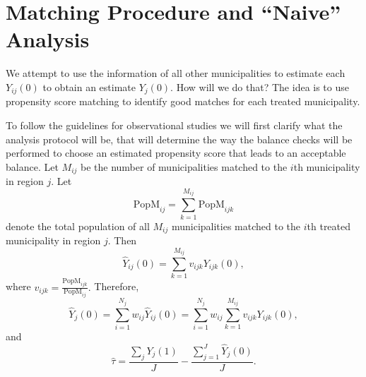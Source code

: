 \documentclass{article}[11 pt]
\begin{document}
\section{Matching Procedure and ``Naive'' Analysis}

We attempt to use the information of all other municipalities to estimate each $Y_{ij}(0)$ to obtain an estimate $Y_j(0)$. How will we do that? The idea is to use propensity score matching to identify good matches for each treated municipality.

To follow the guidelines for observational studies we will first clarify what the analysis protocol will be, that will determine the way the balance checks will be performed to choose an estimated propensity score that leads to an acceptable balance.
Let $M_{ij}$ be the number of municipalities matched to the $i$th municipality in region $j$. Let $$\textrm{PopM}_{ij}=\sum_{k=1}^{M_{ij}}\textrm{PopM}_{ijk}$$ denote the total population of all $M_{ij}$ municipalities matched to the $i$th treated municipality in region $j$. Then 
$$\hat{Y}_{ij}(0) =\sum_{k=1}^{M_{ij}}v_{ijk}Y_{ijk}(0),$$ where $v_{ijk}=\frac{\textrm{PopM}_{ijk}}{\textrm{PopM}_{ij}}.$
Therefore,
$$\hat{Y}_{j}(0) =\sum_{i=1}^{N_j}w_{ij}\hat{Y}_{ij}(0)=\sum_{i=1}^{N_j}w_{ij}\sum_{k=1}^{M_{ij}}v_{ijk}Y_{ijk}(0),$$
and
$$\hat{\tau}=\frac{\sum_j Y_j(1)}{J}-\frac{\sum_{j=1}^{J}\hat{Y}_j(0)}{J}.$$
\end{document}
